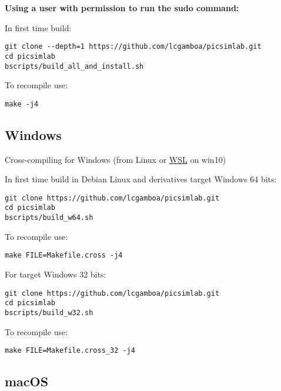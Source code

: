 \textbf{Using a user with permission to run the sudo command:}

In first time build:
\begin{verbatim}
git clone --depth=1 https://github.com/lcgamboa/picsimlab.git
cd picsimlab
bscripts/build_all_and_install.sh
\end{verbatim}

To recompile use:
\begin{verbatim}
make -j4
\end{verbatim}

\subsection{Windows}

 Cross-compiling for Windows (from Linux or \href{https://docs.microsoft.com/windows/wsl/install-win10}{WSL} on win10)

In first time build in Debian Linux and derivatives target Windows 64 bits:

 \begin{verbatim}
git clone https://github.com/lcgamboa/picsimlab.git
cd picsimlab
bscripts/build_w64.sh
\end{verbatim}

To recompile use:

\begin{verbatim}
make FILE=Makefile.cross -j4 
\end{verbatim}

For target Windows 32 bits:

\begin{verbatim}
git clone https://github.com/lcgamboa/picsimlab.git
cd picsimlab
bscripts/build_w32.sh
\end{verbatim}

To recompile use:
\begin{verbatim}
make FILE=Makefile.cross_32 -j4 
\end{verbatim}

\subsection{macOS}

